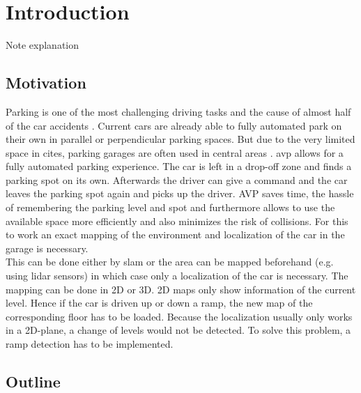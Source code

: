 \chapter{Introduction}
\label{ch:Introduction}
Note explanation

\section{Motivation}
Parking is one of the most challenging driving tasks and the cause of almost half of the car accidents \cite{accident}.
Current cars are already able to fully automated park on their own in parallel or perpendicular parking spaces.
But due to the very limited space in cites, parking garages are often used in central areas \cite{7995971}.
\gls{avp} allows for a fully automated parking experience.
The car is left in a drop-off zone and finds a parking spot on its own.
 Afterwards the driver can give a command and the car leaves the parking spot again and picks up the driver.
 AVP saves time, the hassle of remembering the parking level and spot and furthermore allows to use the available space more efficiently and also minimizes the risk of collisions.
 For this to work an exact mapping of the environment and localization of the car in the garage is necessary.\\
This can be done either by \gls{slam} or the area can be mapped beforehand (e.g. using \gls{lidar} sensors) in which case only a localization of the car is necessary.
The mapping can be done in 2D or 3D. 2D maps only show information of the current level. Hence if the car is driven up or down a ramp, the new map of the corresponding floor has to be loaded.
Because the localization usually only works in a 2D-plane, a change of levels would not be detected.
To solve this problem, a ramp detection has to be implemented.



\section{Outline}

